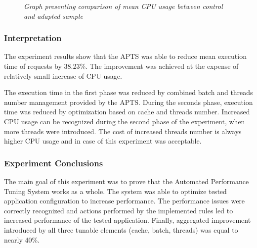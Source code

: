 \documentclass[12pt,a4paper]{article}
\begin{document}
\begin{figure}[!htb]
\centering
{}
\caption{\textit{Graph presenting comparison of mean CPU usage between control and adapted sample}} \label{figure:combined:results:cpuusage}
\end{figure}


\subsubsection{Interpretation} 

The experiment results show that the APTS was able to reduce mean execution time of requests by 38.23\%. The improvement was achieved at the expense of relatively small increase of CPU usage. 

The execution time in the first phase was reduced by combined batch and threads number management provided by the APTS. During the seconds phase, execution time was reduced by optimization based on cache and threads number. Increased CPU usage can be recognized during the second phase of the experiment, when more threads were introduced. The cost of increased threads number is always higher CPU usage and in case of this experiment was acceptable.  

\subsubsection{Experiment Conclusions} 

The main goal of this experiment was to prove that the Automated Performance Tuning System works as a whole. The system was able to optimize tested application configuration to increase performance. The performance issues were correctly recognized and actions performed by the implemented rules led to increased performance of the tested application. Finally, aggregated improvement introduced by all three tunable elements (cache, batch, threads) was equal to nearly 40\%.
\end{document}
